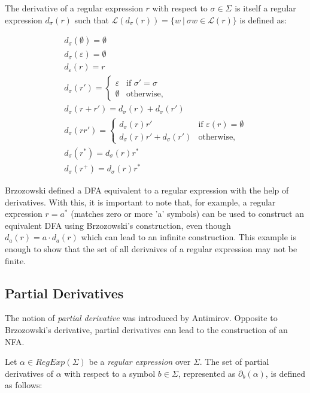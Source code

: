 The derivative of a regular expression $r$ with respect to $\sigma \in \Sigma$ is itself a regular expression $d_\sigma(r)$ such that $\mathcal{L}(d_\sigma(r)) = \{w \ \vert \ \sigma w \in \mathcal{L}(r)\}$ is defined as:

\begin{gather*}
    d_\sigma(\emptyset) = \emptyset \\
    d_\sigma(\varepsilon) = \emptyset \\
    d_\varepsilon(r) = r \\
    d_\sigma(r') = \begin{cases}
        \varepsilon & \text{if $\sigma' = \sigma$} \\
        \emptyset & \text{otherwise,}
    \end{cases} \\
    d_\sigma(r+r') = d_\sigma(r)+d_\sigma(r') \\
    d_\sigma(rr') = \begin{cases}
        d_\sigma(r)r' & \text{if $\varepsilon(r) = \emptyset$} \\
        d_\sigma(r)r' + d_\sigma(r') & \text{otherwise,}
    \end{cases} \\
    d_\sigma(r^*) = d_\sigma(r)r^* \\
    d_\sigma(r^+) = d_\sigma(r)r^*
\end{gather*}

Brzozowski defined a DFA equivalent to a regular expression with the help of derivatives. With this, it is important to note that, for example, a regular expression $r = a^*$ (matches zero or more 'a' symbols) can be used to construct an equivalent DFA using Brzozowski's construction, even though $d_a(r) = a \cdot d_a(r)$ which can lead to an infinite construction. This example is enough to show that the set of all derivaives of a regular expression may not be finite.

\subsection{Partial Derivatives}
The notion of \textit{partial derivative} was introduced by Antimirov. Opposite to Brzozowski's derivative, partial derivatives can lead to the construction of an NFA.

Let $\alpha \in RegExp(\Sigma)$ be a \textit{regular expression} over $\Sigma$. The set of partial derivatives of $\alpha$ with respect to a symbol $b \in \Sigma$, represented as $\partial_b(\alpha)$, is defined as follows:


